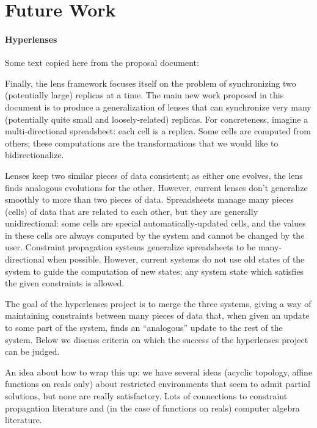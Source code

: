 \section{Future Work}
\label{sec:future}

\paragraph*{Hyperlenses}
Some text copied here from the proposal document:

Finally, the lens framework focuses itself on the problem of synchronizing
two (potentially large) replicas at a time. The main new work proposed in
this document is to produce a generalization of lenses that can synchronize
very many (potentially quite small and loosely-related) replicas. For
concreteness, imagine a multi-directional spreadsheet: each cell is a
replica. Some cells are computed from others; these computations are the
transformations that we would like to bidirectionalize.

Lenses keep two similar pieces of data consistent; as either one evolves,
the lens finds analogous evolutions for the other. However, current lenses
don't generalize smoothly to more than two pieces of data. Spreadsheets
manage many pieces (cells) of data that are related to each other, but they
are generally unidirectional: some cells are special automatically-updated
cells, and the values in these cells are always computed by the system and
cannot be changed by the user. Constraint propagation systems generalize
spreadsheets to be many-directional when possible. However, current systems
do not use old states of the system to guide the computation of new states;
any system state which satisfies the given constraints is allowed.

The goal of the hyperlenses project is to merge the three systems, giving a
way of maintaining constraints between many pieces of data that, when given
an update to some part of the system, finds an ``analogous'' update to the
rest of the system. Below we discuss criteria on which the success of the
hyperlenses project can be judged.

An idea about how to wrap this up: we have several ideas (acyclic topology,
affine functions on reals only) about restricted environments that seem to
admit partial solutions, but none are really satisfactory. Lots of
connections to constraint propagation literature and (in the case of
functions on reals) computer algebra literature.


